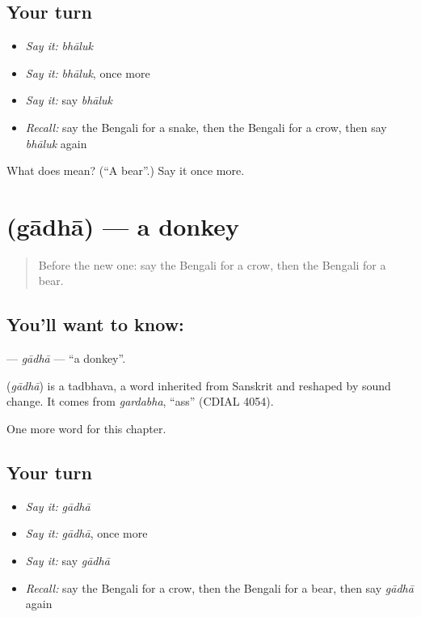 \subsection*{Your turn}
\begin{itemize}
\raggedright
  \item \emph{Say it:} \emph{bhāluk}
  \item \emph{Say it:} \emph{bhāluk}, once more
  \item \emph{Say it:} say \emph{bhāluk}
  \item \emph{Recall:} say the Bengali for a snake, then the Bengali for a crow, then say \emph{bhāluk} again
\end{itemize}

\begin{tcolorbox}[breakable,colback=teal!4,colframe=teal!35!black,title={Before you move on}]
What does  mean? (\textquotedblleft{}A bear\textquotedblright{}.) Say it once more.
\end{tcolorbox}
\section[\texorpdfstring{\bn{গাধা} (gādhā)}{গাধা (gādhā)}]{ (gādhā) — a donkey}

\label{lesson:BN-C71-gadha}



\begin{quote}
Before the new one: say the Bengali for a crow, then the Bengali for a bear.
\end{quote}

\subsection*{You'll want to know: }
\textbf{} — \emph{gādhā} — \textquotedblleft{}a donkey\textquotedblright{}.

\begin{cousinweb}
\textbf{} (\emph{gādhā}) is a tadbhava, a word inherited from Sanskrit and reshaped by sound change. It comes from \emph{gardabha}, \textquotedblleft{}ass\textquotedblright{} (CDIAL 4054).
\end{cousinweb}

\begin{grammarlens}[title={What you've built}]
One more word for this chapter.
\end{grammarlens}

\subsection*{Your turn}
\begin{itemize}
\raggedright
  \item \emph{Say it:} \emph{gādhā}
  \item \emph{Say it:} \emph{gādhā}, once more
  \item \emph{Say it:} say \emph{gādhā}
  \item \emph{Recall:} say the Bengali for a crow, then the Bengali for a bear, then say \emph{gādhā} again
\end{itemize}

